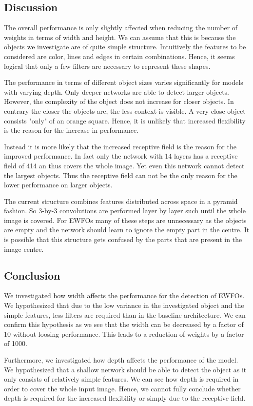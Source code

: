 \subsection{Discussion}

The overall performance is only slightly affected when reducing the number of weights in terms of width and height. We can assume that this is because the objects we investigate are of quite simple structure. Intuitively the features to be considered are color, lines and edges in certain combinations. Hence, it seems logical that only a few filters are necessary to represent these shapes.

The performance in terms of different object sizes varies significantly for models with varying depth. Only deeper networks are able to detect larger objects. However, the complexity of the object does not increase for closer objects. In contrary the closer the objects are, the less context is visible. A very close object consists "only" of an orange square. Hence, it is unlikely that increased flexibility is the reason for the increase in performance. 

Instead it is more likely that the increased receptive field is the reason for the improved performance. In fact only the network with 14 layers has a receptive field of 414 an thus covers the whole image. Yet even this network cannot detect the largest objects. Thus the receptive field can not be the only reason for the lower performance on larger objects.

The current structure combines features distributed across space in a pyramid fashion. So 3-by-3 convolutions are performed layer by layer such until the whole image is covered. For \acp{EWFO} many of these steps are unnecessary as the objects are empty and the network should learn to ignore the empty part in the centre. It is possible that this structure gets confused by the parts that are present in the image centre.

\subsection{Conclusion}

We investigated how width affects the performance for the detection of \acp{EWFO}. We hypothesized that due to the low variance in the investigated object and the simple features, less filters are required than in the baseline architecture. We can confirm this hypothesis as we see that the width can be decreased by a factor of 10 without loosing performance. This leads to a reduction of weights by a factor of 1000. 

Furthermore, we investigated how depth affects the performance of the model. We hypothesized that a shallow network should be able to detect the object as it only consists of relatively simple features. We can see how depth is required in order to cover the whole input image. Hence, we cannot fully conclude whether depth is required for the increased flexibility or simply due to the receptive field. 





